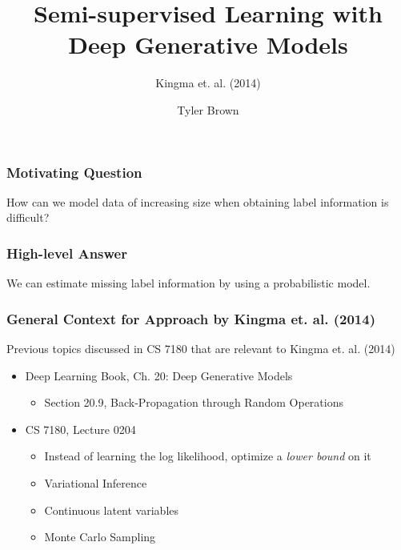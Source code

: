 \documentclass{beamer}
\title{Semi-supervised Learning with Deep Generative Models}
\subtitle{Kingma et. al. (2014)}
\author{Tyler Brown}
\institute{CS 7180}
\date{}
\begin{document}
 
\frame{\titlepage}
 
\begin{frame}
  \frametitle{Motivating Question}
  How can we model data of increasing size when obtaining label 
  information is difficult?
\end{frame}

\begin{frame}
  \frametitle{High-level Answer}

  We can estimate missing label information by
  using a probabilistic model.
  
\end{frame}

\begin{frame}
  \frametitle{General Context for Approach by Kingma et. al. (2014)}

  Previous topics discussed in CS 7180 that are relevant to
  Kingma et. al. (2014)

  \begin{itemize}
  \item Deep Learning Book, Ch. 20: Deep Generative Models
    \begin{itemize}
      \item Section 20.9, Back-Propagation through Random Operations
      \end{itemize}
  \item CS 7180, Lecture 0204
    \begin{itemize}
    \item Instead of learning the log likelihood, optimize a
      \textit{lower bound} on it
    \item Variational Inference
    \item Continuous latent variables
    \item Monte Carlo Sampling
      \end{itemize}
  \end{itemize}
\end{frame}
\end{document}

